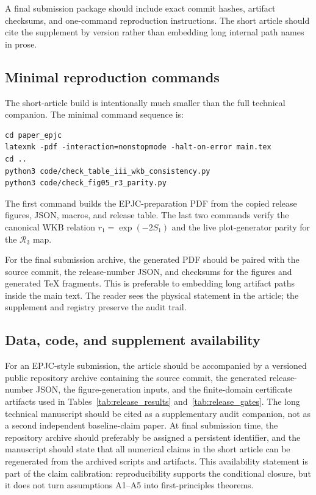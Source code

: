 \documentclass[11pt,a4paper]{article}
\newcommand{\Rthree}{\mathcal{R}_3}
\begin{document}
A final submission package should include exact commit hashes, artifact checksums, and one-command reproduction instructions.
The short article should cite the supplement by version rather than embedding long internal path names in prose.

\subsection{Minimal reproduction commands}

The short-article build is intentionally much smaller than the full technical companion.
The minimal command sequence is:
\begin{verbatim}
cd paper_epjc
latexmk -pdf -interaction=nonstopmode -halt-on-error main.tex
cd ..
python3 code/check_table_iii_wkb_consistency.py
python3 code/check_fig05_r3_parity.py
\end{verbatim}
The first command builds the EPJC-preparation PDF from the copied release figures, JSON, macros, and release table.
The last two commands verify the canonical WKB relation \(r_1=\exp(-2S_1)\) and the live plot-generator parity for the \(\Rthree\) map.

For the final submission archive, the generated PDF should be paired with the source commit, the release-number JSON, and checksums for the figures and generated TeX fragments.
This is preferable to embedding long artifact paths inside the main text.
The reader sees the physical statement in the article; the supplement and registry preserve the audit trail.

\subsection{Data, code, and supplement availability}

For an EPJC-style submission, the article should be accompanied by a versioned public repository archive containing the source commit, the generated release-number JSON, the figure-generation inputs, and the finite-domain certificate artifacts used in Tables~\ref{tab:release_results} and~\ref{tab:release_gates}.
The long technical manuscript should be cited as a supplementary audit companion, not as a second independent baseline-claim paper.
At final submission time, the repository archive should preferably be assigned a persistent identifier, and the manuscript should state that all numerical claims in the short article can be regenerated from the archived scripts and artifacts.
This availability statement is part of the claim calibration: reproducibility supports the conditional closure, but it does not turn assumptions A1--A5 into first-principles theorems.
\end{document}
